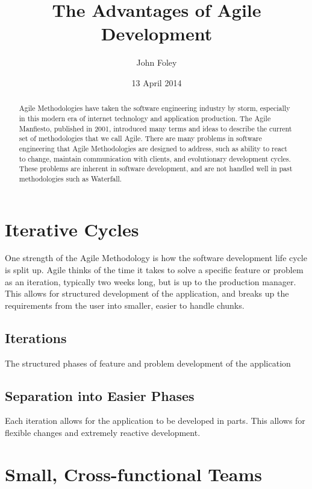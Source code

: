\documentclass[11pt]{article}
\title{The Advantages of Agile Development}
\author{John Foley}
\date{13 April 2014}
\begin{document}
\maketitle

\thispagestyle{empty}

\begin{abstract}
  Agile Methodologies have taken the software engineering industry by storm, especially in this modern
  era of internet technology and application production. The Agile Manfiesto, published in 2001,
 introduced many terms and ideas to describe the current set of methodologies that we call Agile. There are many
 problems in software engineering that Agile Methodologies are designed to address, such as ability to react to 
 change, maintain communication with clients, and evolutionary development cycles. These problems are inherent
 in software development, and are not handled well in past methodologies such as Waterfall. 
\end{abstract}

\section{Iterative Cycles}

One strength of the Agile Methodology is how the software development life cycle is split up. Agile thinks
of the time it takes to solve a specific feature or problem as an iteration, typically two weeks long, but
is up to the production manager. This allows for structured development of the application, and breaks
up the requirements from the user into smaller, easier to handle chunks. 

\subsection{Iterations} 
The structured phases of feature and problem development of the application

\subsection{Separation into Easier Phases} 
Each iteration allows for the application to be developed in parts. This allows for flexible changes and
extremely reactive development.~\cite{Cao:2010:MDA:1877725.1877730}

\section{Small, Cross-functional Teams}
\end{document}
